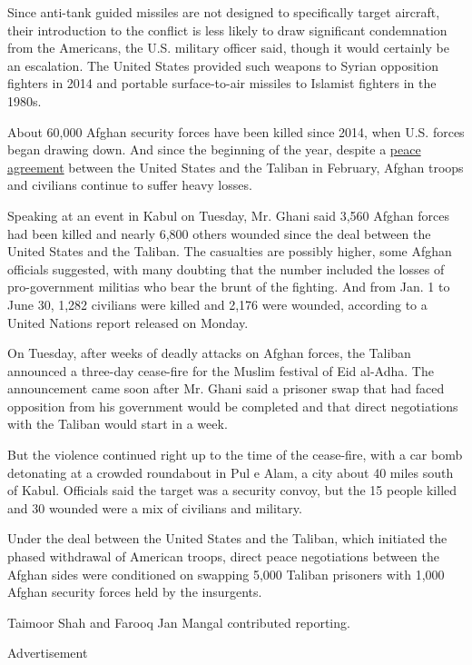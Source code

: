 Since anti-tank guided missiles are not designed to specifically target
aircraft, their introduction to the conflict is less likely to draw
significant condemnation from the Americans, the U.S. military officer
said, though it would certainly be an escalation. The United States
provided such weapons to Syrian opposition fighters in 2014 and portable
surface-to-air missiles to Islamist fighters in the 1980s.

About 60,000 Afghan security forces have been killed since 2014, when
U.S. forces began drawing down. And since the beginning of the year,
despite a
\href{https://www.nytimes3xbfgragh.onion/2020/02/29/world/asia/us-taliban-deal.html}{peace
agreement} between the United States and the Taliban in February, Afghan
troops and civilians continue to suffer heavy losses.

Speaking at an event in Kabul on Tuesday, Mr. Ghani said 3,560 Afghan
forces had been killed and nearly 6,800 others wounded since the deal
between the United States and the Taliban. The casualties are possibly
higher, some Afghan officials suggested, with many doubting that the
number included the losses of pro-government militias who bear the brunt
of the fighting. And from Jan. 1 to June 30, 1,282 civilians were killed
and 2,176 were wounded, according to a United Nations report released on
Monday.

On Tuesday, after weeks of deadly attacks on Afghan forces, the Taliban
announced a three-day cease-fire for the Muslim festival of Eid al-Adha.
The announcement came soon after Mr. Ghani said a prisoner swap that had
faced opposition from his government would be completed and that direct
negotiations with the Taliban would start in a week.

But the violence continued right up to the time of the cease-fire, with
a car bomb detonating at a crowded roundabout in Pul e Alam, a city
about 40 miles south of Kabul. Officials said the target was a security
convoy, but the 15 people killed and 30 wounded were a mix of civilians
and military.

Under the deal between the United States and the Taliban, which
initiated the phased withdrawal of American troops, direct peace
negotiations between the Afghan sides were conditioned on swapping 5,000
Taliban prisoners with 1,000 Afghan security forces held by the
insurgents.

Taimoor Shah and Farooq Jan Mangal contributed reporting.

Advertisement

